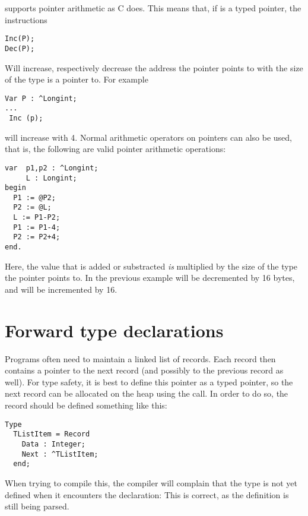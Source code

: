 \fpc supports pointer arithmetic as C does. This means that, if  is a
typed pointer, the instructions
\begin{verbatim}
Inc(P);
Dec(P);
\end{verbatim}
Will increase, respectively decrease the address the pointer points to
with the size of the type  is a pointer to. For example
\begin{verbatim}
Var P : ^Longint;
...
 Inc (p);
\end{verbatim}
will increase  with 4.
Normal arithmetic operators on pointers can also be used, that is, the
following are valid pointer arithmetic operations:
\begin{verbatim}
var  p1,p2 : ^Longint;
     L : Longint;
begin
  P1 := @P2;
  P2 := @L;
  L := P1-P2;
  P1 := P1-4;
  P2 := P2+4;
end.
\end{verbatim}
Here, the value that is added or substracted {\em is } multiplied by the
size of the type the pointer points to. In the previous
example  will be decremented by 16 bytes, and 
 will be incremented by 16.

\section{Forward type declarations}
Programs often need to maintain a linked list of records. Each record then
contains a pointer to the next record (and possibly to the previous record
as well). For type safety, it is best to define this pointer as a typed
pointer, so the next record can be allocated on the heap using the 
call. In order to do so, the record should be defined something like this:
\begin{verbatim}
Type
  TListItem = Record
    Data : Integer;
    Next : ^TListItem;
  end;
\end{verbatim}  
When trying to compile this, the compiler will complain that the
 type is not yet defined when it encounters the 
declaration: This is correct, as the definition is still being parsed.

